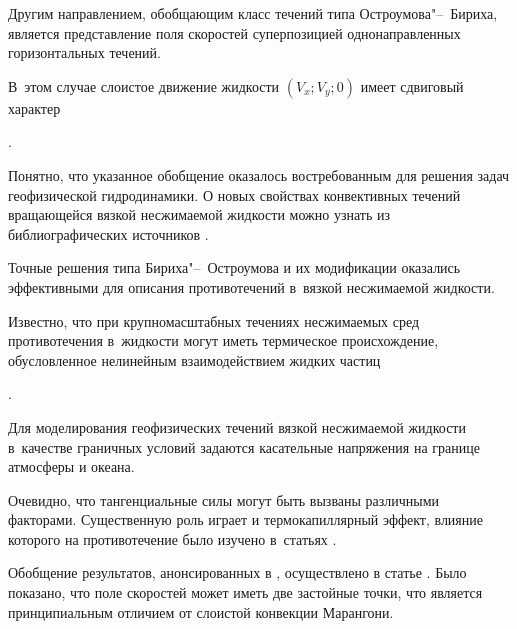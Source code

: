 Другим направлением, обобщающим класс течений типа Остроумова"--~Бириха, является представление поля скоростей суперпозицией однонаправленных горизонтальных течений. 

В~этом случае слоистое движение жидкости $(V_x; V_y; 0 )$ имеет сдвиговый характер

\cite{Aristov_avto, Aristov_Pros3, Aristov_Pros5,  Aristov_Pros7, Aristov_Pros_Spev1, Aristov_Pros_Spev2, Burm_Pros_Samara, Burm_Pros_IOP, Burm_Pros_DREAM, Burm_Pros_AIP, Gorsh_Pros1, Gorsh_Pros2, Knyaz1, Sidorov1,  Schwartz1}.

Понятно, что указанное обобщение оказалось востребованным для решения задач геофизической гидродинамики. О новых свойствах конвективных течений вращающейся вязкой несжимаемой жидкости можно узнать из библиографических источников \cite{Arist2006, Aristov_Schwartz4, Schwartz2, Schwartz3}.



Точные решения типа Бириха"--~Остроумова и их модификации оказались эффективными для описания противотечений в~вязкой несжимаемой жидкости. 

Известно, что при крупномасштабных течениях несжимаемых сред противотечения в~жидкости могут иметь термическое происхождение, обусловленное нелинейным взаимодействием жидких частиц

\cite{Andreev_step, Bek_Gon_Rez_Shef, Bir_Den_Kost1, Bir_Den_Kost2, Bir_Pukhn, Birikh2, Gon_Kab2, Gon_rez, Aristov_Pros3, Aristov_Pros5, Aristov_Pros7, Aristov_Pros_Spev1, Aristov_Pros_Spev2, Burm_Pros_Samara, Burm_Pros_IOP,Burm_Pros_DREAM, Gorsh_Pros1, Gorsh_Pros2, Arist2006, Shtern}.

Для моделирования геофизических течений вязкой несжимаемой жидкости в~качестве граничных условий задаются касательные напряжения на границе атмосферы и океана. 

Очевидно, что тангенциальные силы могут быть вызваны различными факторами. Существенную роль играет и термокапиллярный эффект, влияние которого на противотечение было изучено в~статьях \cite{Aristov_Pros7, Aristov_Pros_Spev1, Aristov_Pros_Spev2, Gorsh_Pros1, Gorsh_Pros2}.



Обобщение результатов, анонсированных в \cite{Aristov_Pros7, Aristov_Pros_Spev1, Aristov_Pros_Spev2, Gorsh_Pros1, Gorsh_Pros2}, осуществлено в статье \cite{Burm_Pros_Samara}. Было показано, что поле скоростей может иметь две застойные точки, что является принципиальным отличием от слоистой конвекции Марангони. 

